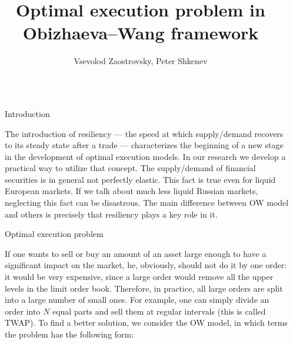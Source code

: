 \documentclass[]{beamer}
\title{Optimal execution problem in Obizhaeva--Wang framework}
\author{Vsevolod Zaostrovsky, Peter Shkenev}
\begin{document}
\nocite{*} %

\begin{frame}[t]
    \begin{columns}[t] %
     
    \begin{column}{\lrmargin}\end{column} %
    
    \begin{column}{\onecolwid} %
     
    
    \begin{block}{Introduction}
    
        The introduction of resiliency --- the speed at which supply/demand recovers to its steady state after 
        a trade --- characterizes the beginning of a new stage in the development of optimal execution models.
        In our research we develop a practical way to utilize that concept. 
        The supply/demand of financial securities is in general not perfectly elastic. This fact is true even for liquid European markets. 
        If we talk about 
        much less liquid Russian markets, neglecting this fact can be disastrous. The main difference between OW model 
        and others is precisely 
        that resiliency plays a key role in it.
        
    
    \end{block}

    \begin{block}{Optimal execution problem}
    
        If one wants to sell or buy an amount of an asset large enough to have a significant 
        impact on the market, he, obviously, should not do it by one order: it would be very expensive, since a large order 
        would remove all the upper levels in the limit order book. Therefore, in practice, all large orders are split into a large number of small ones. 
        For example, one can simply divide an order into $N$ equal parts and sell them at regular intervals (this is called TWAP). 
        To find a better solution, we consider the OW model, in which terms the problem has the following form: \par  



\end{block}
\end{column}
\end{columns}
\end{frame}
\end{document}
